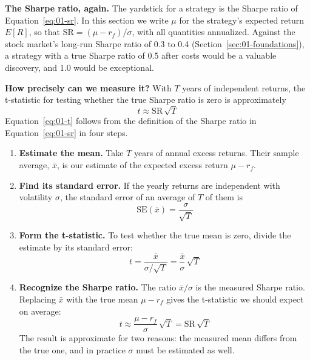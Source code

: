 \textbf{The Sharpe ratio, again.} The yardstick for a strategy is the Sharpe ratio of Equation~\eqref{eq:01-sr}. In this section we write $\mu$ for the strategy's expected return $E[R]$, so that $\mathrm{SR} = (\mu - r_f)/\sigma$, with all quantities annualized. Against the stock market's long-run Sharpe ratio of 0.3 to 0.4 (Section~\ref{sec:01-foundations}), a strategy with a true Sharpe ratio of 0.5 after costs would be a valuable discovery, and 1.0 would be exceptional.

\textbf{How precisely can we measure it?} With $T$ years of independent returns, the t-statistic for testing whether the true Sharpe ratio is zero is approximately
\begin{equation}
  t \approx \mathrm{SR}\,\sqrt{T}
  \label{eq:01-t}
\end{equation}
Equation~\eqref{eq:01-t} follows from the definition of the Sharpe ratio in Equation~\eqref{eq:01-sr} in four steps.

\begin{enumerate}
  \item \textbf{Estimate the mean.} Take $T$ years of annual excess returns. Their sample average, $\bar{x}$, is our estimate of the expected excess return $\mu - r_f$.
  \item \textbf{Find its standard error.} If the yearly returns are independent with volatility $\sigma$, the standard error of an average of $T$ of them is
  \begin{equation}
    \mathrm{SE}(\bar{x}) = \frac{\sigma}{\sqrt{T}} \nonumber
  \end{equation}
  \item \textbf{Form the t-statistic.} To test whether the true mean is zero, divide the estimate by its standard error:
  \begin{equation}
    t = \frac{\bar{x}}{\sigma/\sqrt{T}} = \frac{\bar{x}}{\sigma}\,\sqrt{T} \nonumber
  \end{equation}
  \item \textbf{Recognize the Sharpe ratio.} The ratio $\bar{x}/\sigma$ is the measured Sharpe ratio. Replacing $\bar{x}$ with the true mean $\mu - r_f$ gives the t-statistic we should expect on average:
  \begin{equation}
    t \approx \frac{\mu - r_f}{\sigma}\,\sqrt{T} = \mathrm{SR}\,\sqrt{T} \nonumber
  \end{equation}
  The result is approximate for two reasons: the measured mean differs from the true one, and in practice $\sigma$ must be estimated as well.
\end{enumerate}

